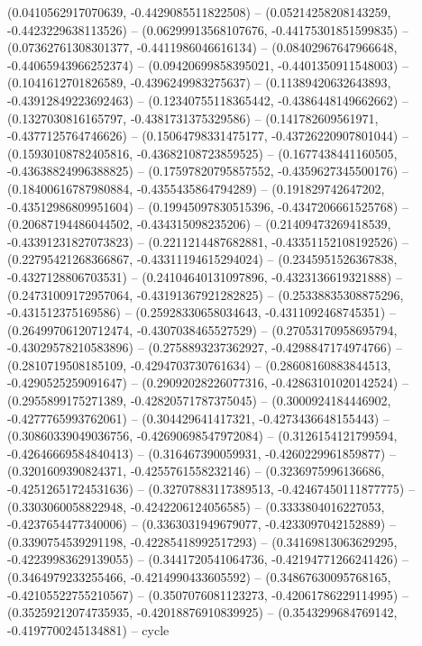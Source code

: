 (0.0410562917070639, -0.4429085511822508) -- (0.05214258208143259, -0.4423229638113526) -- (0.06299913568107676, -0.44175301851599835) -- (0.07362761308301377, -0.4411986046616134) -- (0.08402967647966648, -0.44065943966252374) -- (0.09420699858395021, -0.4401350911548003) -- (0.1041612701826589, -0.4396249983275637) -- (0.11389420632643893, -0.43912849223692463) -- (0.12340755118365442, -0.4386448149662662) -- (0.1327030816165797, -0.4381731375329586) -- (0.141782609561971, -0.4377125764746626) -- (0.15064798331475177, -0.43726220907801044) -- (0.15930108782405816, -0.43682108723859525) -- (0.1677438441160505, -0.43638824996388825) -- (0.17597820795857552, -0.4359627345500176) -- (0.18400616787980884, -0.4355435864794289) -- (0.191829742647202, -0.43512986809951604) -- (0.19945097830515396, -0.4347206661525768) -- (0.20687194486044502, -0.434315098235206) -- (0.21409473269418539, -0.43391231827073823) -- (0.2211214487682881, -0.43351152108192526) -- (0.22795421268366867, -0.43311194615294024) -- (0.2345951526367838, -0.4327128806703531) -- (0.24104640131097896, -0.4323136619321888) -- (0.24731009172957064, -0.43191367921282825) -- (0.25338835308875296, -0.431512375169586) -- (0.25928330658034643, -0.4311092468745351) -- (0.26499706120712474, -0.4307038465527529) -- (0.27053170958695794, -0.43029578210583896) -- (0.2758893237362927, -0.4298847174974766) -- (0.2810719508185109, -0.4294703730761634) -- (0.28608160883844513, -0.4290525259091647) -- (0.29092028226077316, -0.42863101020142524) -- (0.2955899175271389, -0.42820571787375045) -- (0.3000924184446902, -0.4277765993762061) -- (0.304429641417321, -0.4273436648155443) -- (0.30860339049036756, -0.42690698547972084) -- (0.3126154121799594, -0.42646669584840413) -- (0.316467390059931, -0.4260229961859877) -- (0.3201609390824371, -0.4255761558232146) -- (0.3236975996136686, -0.42512651724531636) -- (0.32707883117389513, -0.42467450111877775) -- (0.3303060058822948, -0.4242206124056585) -- (0.3333804016227053, -0.4237654477340006) -- (0.3363031949679077, -0.4233097042152889) -- (0.3390754539291198, -0.42285418992517293) -- (0.34169813063629295, -0.42239983629139055) -- (0.3441720541064736, -0.42194771266241426) -- (0.3464979233255466, -0.4214990433605592) -- (0.34867630095768165, -0.42105522755210567) -- (0.3507076081123273, -0.42061786229114995) -- (0.35259212074735935, -0.42018876910839925) -- (0.3543299684769142, -0.4197700245134881) -- cycle
